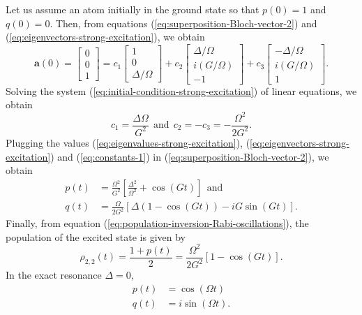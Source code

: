 Let us assume an atom initially in the ground state so that $ p(0) = 1 $ and $ q(0) = 0 $. Then, from equations (\ref{eq:superposition-Bloch-vector-2}) and (\ref{eq:eigenvectors-strong-excitation}), we obtain
\begin{equation}	
	\mathbf{a}(0) = \left[ \begin{matrix} 0 \\ 0 \\ 1 \end{matrix} \right] = c_1 \left[ \begin{matrix} 1 \\ 0 \\ \Delta / \Omega \end{matrix} \right] + c_2 \left[ \begin{matrix} \Delta / \Omega \\ i(G / \Omega) \\ -1 \end{matrix} \right] + c_3 \left[ \begin{matrix} -\Delta / \Omega \\ i(G / \Omega) \\ 1 \end{matrix} \right].
	\label{eq:initial-condition-strong-excitation}
\end{equation}
Solving the system (\ref{eq:initial-condition-strong-excitation})  of linear equations, we obtain
\begin{equation}
	c_1 = \frac{\Delta\Omega}{G^2}\ \ \textrm{and}\ \ c_2 = - c_3 = -\frac{\Omega^2}{2G^2}.
	\label{eq:constants-1}
\end{equation}
Plugging the values (\ref{eq:eigenvalues-strong-excitation}), (\ref{eq:eigenvectors-strong-excitation}) and (\ref{eq:constants-1}) in (\ref{eq:superposition-Bloch-vector-2}), we obtain
\begin{align}
	p(t) &= \frac{\Omega^2}{G^2}\left[\frac{\Delta^2}{\Omega^2} + \cos(Gt) \right]\ \ \textrm{and}
	\label{eq:population-inversion-Rabi-oscillations}
	\\
	q(t) &= \frac{\Omega}{2G^2}[\Delta(1 -  \cos(Gt)) - i G \sin(Gt)].
	\label{eq:coherence-Rabi-oscillations}
\end{align}
Finally, from equation (\ref{eq:population-inversion-Rabi-oscillations}), the population of the excited state is given by
\begin{equation}
	\rho_{2,2}(t) = \frac{1 + p(t)}{2} = \frac{\Omega^2}{2G^2}[1 - \cos(G t)].
	\label{eq:Rabi-oscillations-excited-state}
\end{equation}
In the exact resonance $ \Delta = 0 $,
\begin{align}
	p(t) &= \cos(\Omega t) 
	\label{eq:population-inversion-exact-resonance-strong-excitation}
	\\
	q(t) &= i \sin(\Omega t).
	\label{eq:coherence-exact-resonance-strong-excitation}
\end{align}

